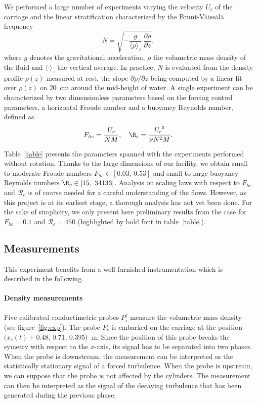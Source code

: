 \noindent We performed a large number of experiments varying the velocity $U_c$
of the carriage and the linear stratification characterized by the
Brunt-V\"aiss\"al\"a frequency
\begin{equation}
 N =  \sqrt{-\frac{g}{\langle\rho\rangle_z}~\frac{\partial \rho}{\partial z}},
\end{equation}
where $g$ denotes the gravitational acceleration, $\rho$ the volumetric mass
density of the fluid and $\langle\cdot\rangle_z$ the vertical average. In
practice, $N$ is evaluated from the density profile $\rho(z)$ measured at rest,
the slope $\partial\rho/\partial z$ being computed by a linear fit over
$\rho(z)$ on 20~cm around the mid-height of water. A single experiment can be
characterized by two dimensionless parameters based on the forcing control
parameters, a horizontal Froude number and a buoyancy Reynolds number, defined
as
\begin{equation}
 F_{hc} = \frac{U_c}{NM},\quad \R_c = \frac{{U_c}^3}{\nu N^2 M}.
\label{eq:c}
\end{equation}



\noindent Table~\ref{table} presents the parameters spanned with the
experiments performed without rotation. Thanks to the large dimensions of our
facility, we obtain small to moderate Froude numbers $F_{hc}\in[0.03,~ 0.53]$
and small to large buoyancy Reynolds numbers $\R_c\in[15,~ 34133]$.
%
\noindent Analysis on scaling laws with respect to $F_{hc}$ and $\mathcal{R}_c$
is of course needed for a careful understanding of the flows. However, as this
project is at its earliest stage, a thorough analysis has not yet been
done. For the sake of simplicity, we only present here preliminary results from
the case for $F_{hc} = 0.1$ and $\mathcal{R}_c=450$ (highlighted by bold font
in table~\ref{table}).

\subsection{Measurements}
\noindent This experiment benefits from a well-furnished instrumentation which is
described in the following.

\paragraph{Density measurements}
Five calibrated conductimetric probes $P_i^j$ measure the volumetric
mass density (see figure~\ref{fig:exp}).
%
The probe $P_c$ is embarked on the carriage at the position $(x_c(t)+0.48$,
0.71, 0.395)~m. Since the position of this probe breaks the symetry with
respect to the $x$-axis, its signal has to be separated into two phases. When
the probe is downstream, the measurement can be interpreted as the
statistically stationary signal of a forced turbulence. When the probe is
upstream, we can suppose that the probe is not affected by the
cylinders. The measurement can then be interpreted as the signal of the
decaying turbulence that has been generated during the previous phase.

